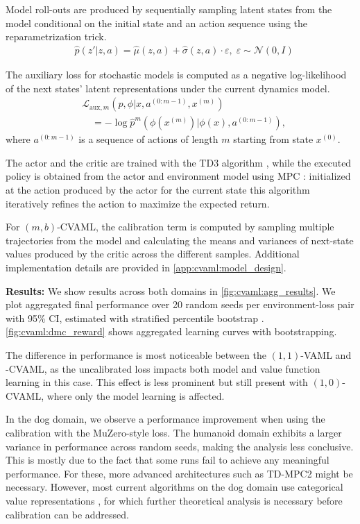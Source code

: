 Model roll-outs are produced by sequentially sampling latent states from the model conditional on the initial state and an action sequence using the reparametrization trick. 
\begin{align}
&\hat{p}(\hat{z}'|z,a)=\hat{\mu}(z,a) + \hat{\sigma}(z,a)\cdot\varepsilon,\; \varepsilon \sim \mathcal{N}(0,I)
\end{align}

The auxiliary loss for stochastic models is computed as a negative log-likelihood of the next states' latent representations under the current dynamics model.
\begin{align}
    &\mathcal{L}_{\mathrm{aux},m}\left(\hat{p},\phi\Big|x,a^{(0:m-1)},x^{(m)}\right) \nonumber\\
    &\quad =-\log \hat{p}^m\left(\phi(x^{(m)})\Big|\phi(x),a^{(0:m-1)}\right),
\end{align}
where $a^{(0:m-1)}$ is a sequence of actions of length $m$ starting from state $x^{(0)}$.

The actor and the critic are trained with the TD3 algorithm \cite{fujimoto2018addressing}, while the executed policy is obtained from the actor and environment model using MPC \cite{hansen2022temporal}: initialized at the action produced by the actor for the current state this algorithm iteratively refines the action to maximize the expected return.

For $(m,b)$-CVAML, the calibration term is computed by sampling multiple trajectories from the model and calculating the means and variances of next-state values produced by the critic across the different samples.
Additional implementation details are provided in \autoref{app:cvaml:model_design}.

\textbf{Results:} We show results across both domains in \autoref{fig:cvaml:agg_results}.
We plot aggregated final performance over 20 random seeds per environment-loss pair with 95\% CI,  estimated with stratified percentile bootstrap \cite{agarwal2021deep}.
\autoref{fig:cvaml:dmc_reward} shows aggregated learning curves with bootstrapping.

The difference in performance is most noticeable between the $(1,1)$-VAML and -CVAML, as the uncalibrated loss impacts both model and value function learning in this case. 
This effect is less prominent but still present with $(1,0)$-CVAML, where only the model learning is affected.

In the dog domain, we observe a performance improvement when using the calibration with the MuZero-style loss.
The humanoid domain exhibits a larger variance in performance across random seeds, making the analysis less conclusive.
This is mostly due to the fact that some runs fail to achieve any meaningful performance.
For these, more advanced architectures such as TD-MPC2 \parencite{hansen2024tdmpc} might be necessary.
However, most current algorithms on the dog domain use categorical value representations \parencite{farebrother2024stop}, for which further theoretical analysis is necessary before calibration can be addressed.

